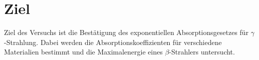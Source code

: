 \section{Ziel}
\label{sec:Ziel}

Ziel des Versuchs ist die Bestätigung des exponentiellen Absorptionsgesetzes für $\gamma$-Strahlung.
Dabei werden die Absorptionskoeffizienten für verschiedene Materialien bestimmt und
die Maximalenergie eines $\beta$-Strahlers untersucht.